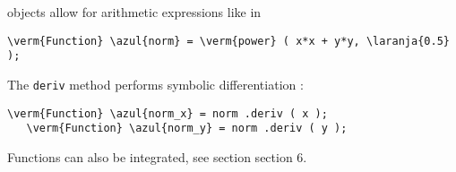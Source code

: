 {\small\tt {}} objects allow for arithmetic expressions like in

\begin{Verbatim}[commandchars=\\\{\},formatcom=\small\tt,
   baselinestretch=0.94,framesep=2mm                     ]
   \verm{Function} \azul{norm} = \verm{power} ( x*x + y*y, \laranja{0.5} );
\end{Verbatim}

The {\small\tt deriv} method performs symbolic differentiation :

\begin{Verbatim}[commandchars=\\\{\},formatcom=\small\tt,
   baselinestretch=0.94,framesep=2mm                     ]
   \verm{Function} \azul{norm_x} = norm .deriv ( x );
   \verm{Function} \azul{norm_y} = norm .deriv ( y );
\end{Verbatim}

Functions can also be integrated, see section \numb section 6.


